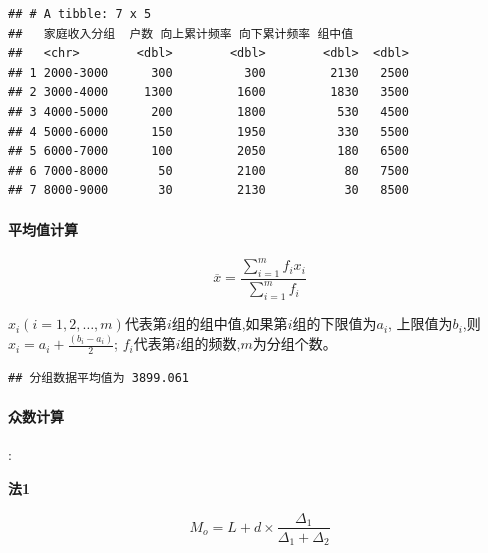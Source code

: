 \documentclass[
]{article}
\newenvironment{Shaded}{\begin{snugshade}}{\end{snugshade}}
\newcommand{\AttributeTok}[1]{\textcolor[rgb]{0.13,0.29,0.53}{#1}}
\newcommand{\CommentTok}[1]{\textcolor[rgb]{0.56,0.35,0.01}{\textit{#1}}}
\newcommand{\FunctionTok}[1]{\textcolor[rgb]{0.13,0.29,0.53}{\textbf{#1}}}
\newcommand{\NormalTok}[1]{#1}
\newcommand{\OtherTok}[1]{\textcolor[rgb]{0.56,0.35,0.01}{#1}}
\newcommand{\SpecialCharTok}[1]{\textcolor[rgb]{0.81,0.36,0.00}{\textbf{#1}}}
\newcommand{\StringTok}[1]{\textcolor[rgb]{0.31,0.60,0.02}{#1}}
\begin{document}
\begin{verbatim}
## # A tibble: 7 x 5
##   家庭收入分组  户数 向上累计频率 向下累计频率 组中值
##   <chr>        <dbl>        <dbl>        <dbl>  <dbl>
## 1 2000-3000      300          300         2130   2500
## 2 3000-4000     1300         1600         1830   3500
## 3 4000-5000      200         1800          530   4500
## 4 5000-6000      150         1950          330   5500
## 5 6000-7000      100         2050          180   6500
## 6 7000-8000       50         2100           80   7500
## 7 8000-9000       30         2130           30   8500
\end{verbatim}

\paragraph{平均值计算}

\[
 \overline{x} = \frac{\sum\limits_{i=1}^{m}f_i x_i}{\sum\limits_{i=1}^{m}f_i}
\]

\(x_i(i = 1,2,\ldots,m)\)代表第\(i\)组的组中值,如果第\(i\)组的下限值为\(a_i\),
上限值为\(b_i\),则\(x_i = a_i + \frac{(b_i - a_i)}{2}\);
\(f_i\)代表第\(i\)组的频数,\(m\)为分组个数。

\begin{Shaded}
\end{Shaded}

\begin{verbatim}
## 分组数据平均值为 3899.061
\end{verbatim}

\paragraph{众数计算}:

\textbf{法1}

\[
 M_o = L + d \times \frac{\Delta_1}{\Delta_1 + \Delta_2}
\]
\end{document}
